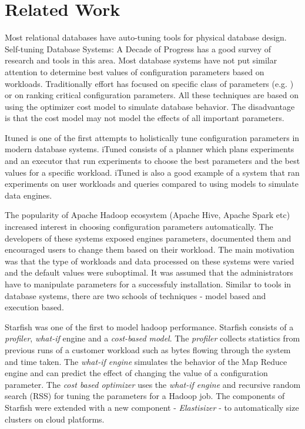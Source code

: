 \section{Related Work}
Most relational databases have auto-tuning tools for physical database design. 
Self-tuning Database Systems: A Decade of Progress\cite{Chaudhuri:2007:SDS:1325851.1325856}
 has a good survey of research and tools in this area. Most database systems have 
not put similar attention to determine best values of configuration parameters 
based on workloads. Traditionally effort has focused on specific class of parameters 
(e.g.\cite{Storm:2006:ASM:1182635.1164220} ) or on ranking
critical configuration parameters\cite{DBLP:conf/icde/DebnathLM08}. All these techniques
are based on using the optimizer cost model to simulate database behavior. The disadvantage is
that the cost model may not model the effects of all important parameters.

Ituned\cite{Duan:2009:TDC:1687627.1687767} is one of the first attempts to holistically 
tune configuration parameters in modern database systems. iTuned consists of a planner
which plans experiments and an executor that run experiments to choose the best parameters
and the best values for a specific workload. iTuned is also a good example of a system that
ran experiments on user workloads and queries compared to using models to simulate data engines.

The popularity of Apache Hadoop ecosystem (Apache Hive, Apache Spark etc) increased interest
in choosing configuration parameters automatically. The developers of these systems exposed
engines parameters, documented them and encouraged users to change them based on their workload.
The main motivation was that the type of workloads and data processed on these systems were varied
and the default values were suboptimal. It was assumed that the administrators have to manipulate
parameters for a successfuly installation. Similar to tools in database systems, there are two schools
of techniques - model based and execution based.

Starfish\cite{herodotou2011starfish} was one of the first to model hadoop performance. Starfish 
consists of a \textit{profiler}, \textit{what-if} engine and a \textit{cost-based model}\cite{herodotou2011profiling}. 
The \textit{profiler} collects statistics from previous runs of a customer workload 
such as bytes flowing through the system and time taken. The \textit{what-if engine} simulates 
the behavior of the Map Reduce engine and can predict the effect of changing the value 
of a configuration parameter. The \textit{cost based optimizer} uses the \textit{what-if engine}
and recursive random search (RSS) for tuning the parameters for a Hadoop job. The components of
Starfish were extended with a new component - \textit{Elastisizer}\cite{Herodotou:2011:NOS:2038916.2038934}
- to automatically size clusters on cloud platforms.  

